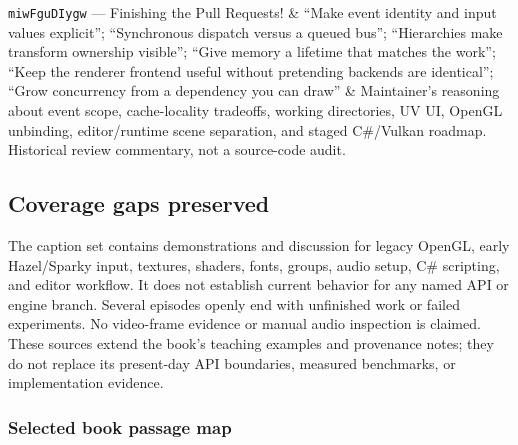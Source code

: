 {\begin{longtable}[]
\texttt{miwFguDIygw} --- Finishing the Pull Requests! & ``Make event identity and input values explicit''; ``Synchronous dispatch versus a queued bus''; ``Hierarchies make transform ownership visible''; ``Give memory a lifetime that matches the work''; ``Keep the renderer frontend useful without pretending backends are identical''; ``Grow concurrency from a dependency you can draw'' & Maintainer's reasoning about event scope, cache-locality tradeoffs, working directories, UV UI, OpenGL unbinding, editor/runtime scene separation, and staged C\#/Vulkan roadmap. Historical review commentary, not a source-code audit. \\
\end{longtable}
}

\subsection{Coverage gaps preserved}\label{coverage-gaps-preserved}

The caption set contains demonstrations and discussion for legacy OpenGL, early Hazel/Sparky input, textures, shaders, fonts, groups, audio setup, C\# scripting, and editor workflow. It does not establish current behavior for any named API or engine branch. Several episodes openly end with unfinished work or failed experiments. No video-frame evidence or manual audio inspection is claimed. These sources extend the book's teaching examples and provenance notes; they do not replace its present-day API boundaries, measured benchmarks, or implementation evidence.

\subsubsection{Selected book passage map}\label{selected-book-passage-map}

